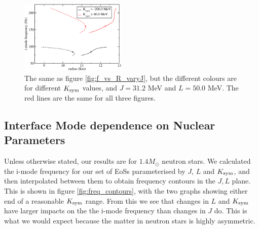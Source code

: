 \documentclass[fleqn,usenatbib]{mnras}
\begin{document}
\begin{figure}
\centering
\includegraphics[width=0.45\textwidth,angle=0]{f_Rcc_Rstar_Kvary.pdf}
\caption{The same as figure \ref{fig:f_vs_R_varyJ}, but the different colours are for different $K_{\rm sym}$ values, and $J=31.2$ MeV and $L=50.0$ MeV. The red lines are the same for all three figures.}
\label{fig:f_vs_R_varyK}
\end{figure}
















\subsection{Interface Mode dependence on Nuclear Parameters}
\hspace{\parindent}Unless otherwise stated, our results are for $1.4M_{\odot}$ neutron stars. We calculated the i-mode frequency for our set of EoSs parameterised by $J$, $L$ and $K_{\rm sym}$, and then interpolated between them to obtain frequency contours in the $J,L$ plane. This is shown in figure \ref{fig:freq_contours}, with the two graphs showing either end of a reasonable $K_{\rm sym}$ range. From this we see that changes in $L$ and $K_{\rm sym}$ have larger impacts on the the i-mode frequency than changes in $J$ do. This is what we would expect because the matter in neutron stars is highly asymmetric.
\end{document}
